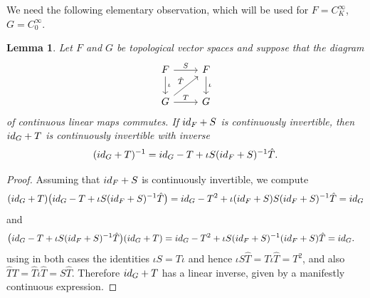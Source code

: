 \documentclass[11pt]{article}
\numberwithin{equation}{section}
\numberwithin{equation}{section}
\newtheorem{Lemma}[Theorem]{Lemma}
\newcommand{\id}{{\rm id}}
\begin{document}
 We need the following elementary observation, which will be used for $F=C_K^\infty$, $G=C_0^\infty$.
 \begin{Lemma}\label{lem:inversetransfer}
 	Let $F$ and $G$ be topological vector spaces and suppose that the diagram
 	\begin{equation*} %
 		\begin{tikzcd}
 			F \arrow[r, "S"]\arrow[d,"\iota"] & F \arrow[d,"\iota"]\\
 			G \arrow[r, "T"]\arrow[ur,"\hat{T}"] & G
 		\end{tikzcd}
 	\end{equation*}
 	of continuous linear maps commutes. If $\id_F+S$ is continuously invertible, then
 	$\id_G+T$ is continuously invertible with inverse
 	\begin{equation*}%
 		(\id_G+ T)^{-1} = \id_G-T+\iota S(\id_F+S)^{-1}\hat{T}.
 	\end{equation*}
 \end{Lemma}
 \begin{proof}
 	Assuming that $\id_F+S$ is continuously invertible, we compute
 	\begin{align*}
 		(\id_G+T)\big(\id_G-T+\iota S(\id_F+S)^{-1}\hat{T}\big) = \id_G-T^2 + \iota (\id_F+S)S(\id_F+S)^{-1}\hat{T}=\id_G
 	\end{align*}
 	and
 	\begin{align*}
 		\big(\id_G-T+\iota S(\id_F+S)^{-1}\hat{T}\big)(\id_G+T) &= \id_G-T^2 + \iota S(\id_F+S)^{-1}(\id_F+S)\hat{T}= \id_G.
 	\end{align*}
 	using in both cases the identities $\iota S=T\iota$ and hence $\iota S \hat{T} = T\iota\hat{T}=T^2$, and also $\hat{T}T = \hat{T}\iota\hat{T} = S\hat{T}$. Therefore $\id_G+T$ has a linear inverse, given by a manifestly continuous expression.
 \end{proof}
\end{document}
